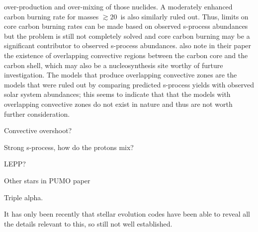 over-production and over-mixing of those nuclides.  A moderately enhanced carbon
burning rate for masses $\gtrsim 20$\Msol\ is also similarly ruled
out.  Thus, limits on core carbon burning rates can be made based on
observed s-process abundances but the problem is still not completely
solved and core carbon burning may be a significant contributor to
observed s-process abundances.  \cite{bennettetal2012} also note in 
their paper the
existence of overlapping convective regions between the carbon core
and the carbon shell, which may also be a nucleosynthesis site worthy
of furture investigation. The models that produce overlapping
convective zones are the models that were ruled out by comparing
predicted s-process yields with observed solar system abundances; this
seems to indicate that that the models with overlapping convective
zones do not exist in nature and thus are not worth further
consideration.

Convective overshoot?

Strong s-process, how do the protons mix?

LEPP?

Other stars in PUMO paper

Triple alpha.

It has only been recently that stellar evolution codes have been able
to reveal all the details relevant to this, so still not well established.
